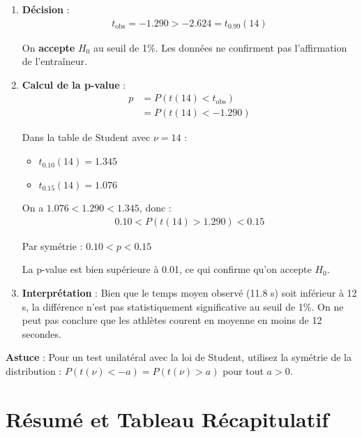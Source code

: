 \documentclass[11pt,a4paper]{article}
\begin{document}
\begin{enumerate}
    Dans la table de Student : $t_{0.01}(14) = 2.624$, donc $P(t(14) < -2.624) = 0.01$
    
    \item \textbf{Décision} :
    \begin{align*}
    t_{\text{obs}} = -1.290 > -2.624 = t_{0.99}(14)
    \end{align*}
    
    On \textbf{accepte} $H_0$ au seuil de 1\%. Les données ne confirment pas l'affirmation de l'entraîneur.
    
    \item \textbf{Calcul de la p-value} :
    \begin{align*}
    p &= P(t(14) < t_{\text{obs}}) \\
    &= P(t(14) < -1.290)
    \end{align*}
    
    Dans la table de Student avec $\nu = 14$ :
    \begin{itemize}
        \item $t_{0.10}(14) = 1.345$
        \item $t_{0.15}(14) = 1.076$
    \end{itemize}
    
    On a $1.076 < 1.290 < 1.345$, donc :
    \begin{align*}
    0.10 < P(t(14) > 1.290) < 0.15
    \end{align*}
    
    Par symétrie : $0.10 < p < 0.15$
    
    La p-value est bien supérieure à 0.01, ce qui confirme qu'on accepte $H_0$.
    
    \item \textbf{Interprétation} : Bien que le temps moyen observé (11.8 s) soit inférieur à 12 s, la différence n'est pas statistiquement significative au seuil de 1\%. On ne peut pas conclure que les athlètes courent en moyenne en moins de 12 secondes.
\end{enumerate}

\begin{astucebox}
\textbf{Astuce} : Pour un test unilatéral avec la loi de Student, utilisez la symétrie de la distribution : $P(t(\nu) < -a) = P(t(\nu) > a)$ pour tout $a > 0$.
\end{astucebox}

\newpage

\section{Résumé et Tableau Récapitulatif}
\end{document}
